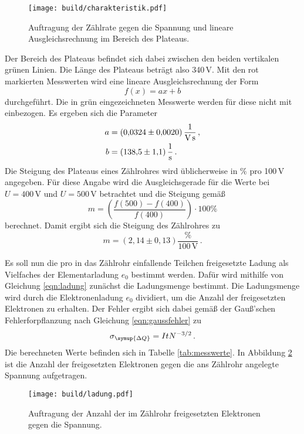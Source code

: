 \begin{figure}
  \centering
  \texttt{[image: build/charakteristik.pdf]}
  \caption{Auftragung der Zählrate gegen die Spannung und lineare Ausgleichsrechnung
  im Bereich des Plateaus.}
  \label{fig:plateau}
\end{figure}

Der Bereich des Plateaus befindet sich dabei zwischen den
beiden vertikalen grünen Linien. Die Länge des Plateaus beträgt also 340\,V.
Mit den rot markierten Messwerten wird eine lineare
Ausgleichsrechnung der Form
\begin{equation}
  f(x)=ax+b
\end{equation}
durchgeführt. Die in grün eingezeichneten Messwerte werden für diese nicht mit
einbezogen. Es ergeben sich die Parameter
\begin{align*}
  a &= (0{,}0324 \pm 0{,}0020)\, \frac{1}{\text{V\,s}} \,,\\
  b &= (138{,}5 \pm 1{,}1)\,\frac{1}{\text{s}} \,.
\end{align*}
Die Steigung des Plateaus eines Zählrohres wird üblicherweise in $\%$ pro 100\,V
angegeben. Für diese Angabe wird die Ausgleichsgerade für die Werte bei $U=400\,$V
und $U=500\,$V betrachtet und die Steigung gemäß
\begin{equation*}
	m=\left(\frac{f(500)-f(400)}{f(400)}\right)\cdot 100\%
\end{equation*}
berechnet. Damit ergibt sich die Steigung des Zählrohres zu
\begin{equation*}
	m=(2{,}14 \pm 0{,}13)\frac{\%}{100\, \text{V}}\,.
\end{equation*}

Es soll nun die pro in das Zählrohr einfallende Teilchen freigesetzte Ladung
als Vielfaches der Elementarladung $e_0$ bestimmt werden. Dafür wird mithilfe von
Gleichung \eqref{eqn:ladung} zunächst die Ladungsmenge bestimmt. Die Ladungsmenge wird durch die
Elektronenladung $e_0$ dividiert, um die Anzahl der freigesetzten Elektronen
zu erhalten. Der Fehler ergibt sich dabei
gemäß der Gauß'schen Fehlerforpflanzung nach Gleichung \eqref{eqn:gaussfehler} zu
\begin{equation*}
  \sigma_{\symup{\Delta Q}} =  I t N^{-3/2}\,.
\end{equation*}
Die berechneten Werte befinden sich in Tabelle \ref{tab:messwerte}.
In Abbildung \ref{fig:ladung} ist die Anzahl der freigesetzten Elektronen
gegen die ans Zählrohr angelegte Spannung aufgetragen.

\begin{figure}
  \centering
  \texttt{[image: build/ladung.pdf]}
  \caption{Auftragung der Anzahl der im Zählrohr freigesetzten Elektronen gegen die Spannung.}
  \label{fig:ladung}
\end{figure}


